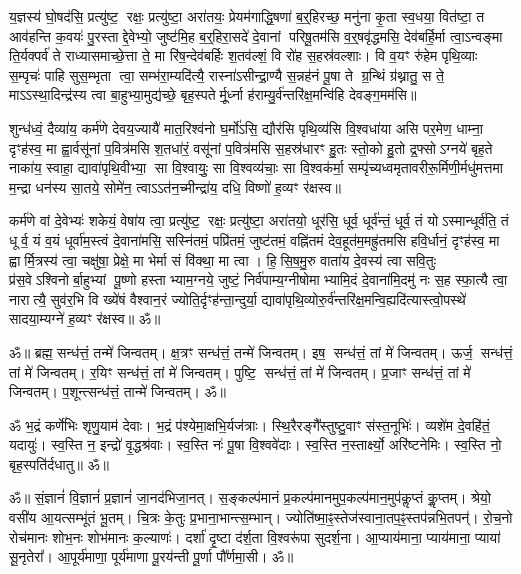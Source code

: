 य॒ज्ञस्य॑ घो॒षद॑सि॒ प्रत्यु॑ष्ट॒ रक्षः॒ प्रत्यु॑ष्टा॒ अरा॑तयः॒ प्रेयम॑गाद्धि॒षणा॑ ब॒र्॒हिरच्छ॒
मनु॑ना कृ॒ता स्व॒धया॒ वित॑ष्टा॒ त आव॑हन्ति क॒वयः॑ पु॒रस्ताद्दे॒वेभ्यो॒ जुष्ट॑मि॒ह ब॒र्॒हिरा॒सदे॑
दे॒वानां परिषू॒तम॑सि व॒र्॒षवृ॑द्धमसि॒ देव॑बर्हि॒र्मा त्वा॒ऽन्वङ्मा ति॒र्यक्पर्व॑ ते
राध्यासमाच्छे॒त्ता ते॒ मा रि॑ष॒न्देव॑बर्हिः श॒तव॑ल्शं॒ वि रो॑ह स॒हस्र॑वल्शाः। वि व॒यꣳ
रु॑हेम पृथि॒व्याः स॒म्पृचः॑ पाहि सुस॒म्भृता त्वा॒ सम्भ॑रा॒म्यदि॑त्यै॒ रास्ना॑ऽसीन्द्रा॒ण्यै
स॒न्नह॑नं पू॒षा ते ग्र॒न्थिं ग्र॑थ्नातु॒ स ते॒ माऽऽस्था॒दिन्द्र॑स्य त्वा बा॒हुभ्या॒मुद्य॑च्छे॒
बृह॒स्पतेर्मू॒र्ध्ना ह॑राम्यु॒र्व॑न्तरि॑क्ष॒मन्वि॑हि देवङ्ग॒मम॑सि॥

शुन्ध॑ध्वं॒ दैव्या॑य॒ कर्म॑णे देवय॒ज्यायै॑ मात॒रिश्व॑नो घ॒र्मो॑ऽसि॒ द्यौर॑सि पृथि॒व्य॑सि वि॒श्वधा॑या
असि पर॒मेण॒ धाम्ना॒ दृꣳह॑स्व॒ मा ह्वा॒र्वसू॑नां प॒वित्र॑मसि श॒तधा॑रं॒ वसू॑नां प॒वित्र॑मसि
स॒हस्र॑धारꣳ हु॒तः स्तो॒को हु॒तो द्र॒फ्सोऽग्नये॑ बृह॒ते नाका॑य॒ स्वाहा॒ द्यावा॑पृथि॒वीभ्या॒ सा
वि॒श्वायुः॒ सा वि॒श्वव्य॑चाः॒ सा वि॒श्वक॑र्मा॒ सम्पृ॑च्यध्वमृतावरीरू॒र्मिणी॒र्मधु॑मत्तमा म॒न्द्रा
धन॑स्य सा॒तये॒ सोमे॑न॒ त्वाऽऽत॑न॒च्मीन्द्रा॑य॒ दधि॒ विष्णो॑ ह॒व्यꣳ र॑क्षस्व॥ 

कर्म॑णे वां दे॒वेभ्यः॑ शकेयं॒ वेषा॑य त्वा॒ प्रत्यु॑ष्ट॒ रक्षः॒ प्रत्यु॑ष्टा॒ अरा॑तयो॒ धूर॑सि॒
धूर्व॒ धूर्व॑न्तं॒ धूर्व॒ तं योऽस्मान्धूर्व॑ति॒ तं धूर्व॒ यं व॒यं धूर्वा॑म॒स्त्वं दे॒वाना॑मसि॒
सस्नि॑तमं॒ पप्रि॑तमं॒ जुष्ट॑तमं॒ वह्नि॑तमं देव॒हूत॑म॒मह्रु॑तमसि हवि॒र्धानं॒ दृꣳह॑स्व॒ मा
ह्वार्मि॒त्रस्य॑ त्वा॒ चक्षु॑षा॒ प्रेक्षे॒ मा भेर्मा सं वि॑क्था॒ मा त्वा।
हि॒सि॒ष॒मु॒रु वाता॑य दे॒वस्य॑ त्वा सवि॒तुः प्र॑स॒वेऽश्विनोर्बा॒हुभ्यां पू॒ष्णो
हस्ताभ्याम॒ग्नये॒ जुष्टं॒ निर्व॑पाम्य॒ग्नीषोमाभ्यामि॒दं दे॒वाना॑मि॒दमु॑ नः स॒ह स्फा॒त्यै त्वा॒
नारात्यै॒ सुव॑र॒भि वि ख्ये॑षं वैश्वान॒रं ज्योति॒र्दृꣳह॑न्ता॒न्दुर्या॒
द्यावा॑पृथि॒व्योरु॒र्व॑न्तरि॑क्ष॒मन्वि॒ह्यदि॑त्यास्त्वो॒पस्थे॑ सादया॒म्यग्ने॑ ह॒व्यꣳ र॑क्षस्व॥ ॐ॥

ॐ॥ ब्रह्म॒ सन्ध॑त्तं॒ तन्मे॑ जिन्वतम्।
क्ष॒त्रꣳ सन्ध॑त्तं॒ तन्मे॑ जिन्वतम्।
इष॒ सन्ध॑त्तं॒ तां मे॑ जिन्वतम्।
ऊर्ज॒ सन्ध॑त्तं॒ तां मे॑ जिन्वतम्।
र॒यिꣳ सन्ध॑त्तं॒ तां मे॑ जिन्वतम्।
पुष्टि॒ सन्ध॑त्तं॒ तां मे॑ जिन्वतम्।
प्र॒जाꣳ सन्ध॑त्तं॒ तां मे॑ जिन्वतम्।
प॒शून्त्सन्ध॑त्तं॒ तान्मे॑ जिन्वतम्। ॐ॥

ॐ भ॒द्रं कर्णे॑भिः शृणु॒याम॑ देवाः। भ॒द्रं प॑श्येमा॒क्षभि॒र्यज॑त्राः। 
स्थि॒रैरङ्गै᳚स्तुष्टु॒वाꣳ स॑स्त॒नूभिः॑। व्यशे॑म दे॒वहि॑तं॒ यदायुः॑। 
स्व॒स्ति न॒ इन्द्रो॑ वृ॒द्धश्र॑वाः। स्व॒स्ति नः॑ पू॒षा वि॒श्ववे॑दाः। 
स्व॒स्ति न॒स्तार्क्ष्यो॒ अरि॑ष्टनेमिः। स्व॒स्ति नो॒ बृह॒स्पति॑र्दधातु॥ ॐ॥

ॐ॥ सं॒ज्ञानं॑ वि॒ज्ञानं॑ प्र॒ज्ञानं॑ जा॒नद॑भिजा॒नत्।
स॒ङ्कल्प॑मानं प्र॒कल्प॑मानमुप॒\-कल्प॑मान॒मुप॑कॢप्तं कॢ॒प्तम्।
श्रेयो॒ वसी॑य आ॒यत्सम्भू॑तं भू॒तम्।
चि॒त्रः के॒तुः प्र॒भाना॒भान्त्स॒म्भान्।
ज्योति॑ष्मा॒ꣴ॒स्तेज॑स्वाना॒तप॒ꣴ॒\-स्तप॑न्नभि॒\-तपन्॑।
रो॒च॒नो रोच॑मानः शोभ॒नः शोभ॑मानः क॒ल्याणः॑।
दर्\mbox{}शा॑ दृ॒ष्टा द॑र्\mbox{}श॒ता वि॒श्वरू॑पा सुदर्\mbox{}श॒ना।
आ॒प्याय॑माना॒ प्याय॑माना॒ प्याया॑ सू॒नृतेरा᳚।
आ॒पूर्य॑माणा॒ पूर्य॑माणा पू॒रय॑न्ती पू॒र्णा पौ᳚र्णमा॒सी। ॐ॥

